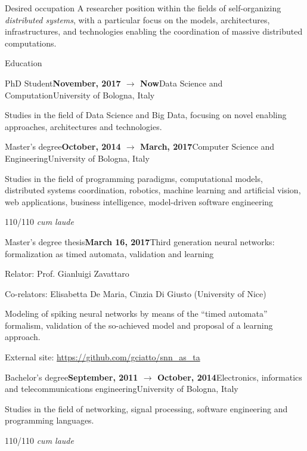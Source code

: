 \documentclass{resume} %
\begin{document}
\begin{rSection}{Desired occupation}
A researcher position within the fields of self-organizing \emph{distributed systems}, with a particular focus on the models, architectures, infrastructures, and technologies enabling the coordination of massive distributed computations.
\end{rSection}


\begin{rSection}{Education}
\begin{rSubsection}{PhD Student}{\textbf{November, 2017 $\rightarrow$ Now}}{Data Science and Computation}{University of Bologna, Italy}
	\item Studies in the field of Data Science and Big Data, focusing on novel enabling approaches, architectures and technologies.
\end{rSubsection}

\begin{rSubsection}{Master's degree}{\textbf{October, 2014 $\rightarrow$ March, 2017}}{Computer Science and Engineering}{University of Bologna, Italy}
\item Studies in the field of programming paradigms, computational models, distributed systems coordination, robotics, machine learning and artificial vision, web applications, business intelligence, model-driven software engineering

\item 110/110 \emph{cum laude}
\end{rSubsection}
\begin{rSubsection}{Master's degree thesis}{\textbf{March 16, 2017}}{Third generation neural networks: formalization as timed automata, validation and learning}{\begin{flushright}
			Relator: Prof. Gianluigi Zavattaro
		\end{flushright}}
	\item Co-relators: Elisabetta De Maria, Cinzia Di Giusto (University of Nice)
	\item Modeling of spiking neural networks by means of the ``timed automata'' formalism, validation of the so-achieved model and proposal of a learning approach.
	
	\item External site: \url{https://github.com/gciatto/snn_as_ta}
\end{rSubsection}
\begin{rSubsection}{Bachelor's degree}{\textbf{September, 2011 $\rightarrow$ October, 2014}}{Electronics, informatics and telecommunications engineering}{University of Bologna, Italy}
	\item Studies in the field of networking, signal processing, software engineering and programming languages.
	\item 110/110 \emph{cum laude}
\end{rSubsection}


\end{rSection}
\end{document}
